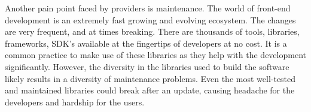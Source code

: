 Another pain point faced by providers is maintenance. The world of front-end development is an extremely fast growing and evolving ecosystem. The changes are very frequent, and at times breaking. There are thousands of tools, libraries, frameworks, SDK’s available at the fingertips of developers at no cost. It is a common practice to make use of these libraries as they help with the development significantly. However, the diversity in the libraries used to build the software likely results in a diversity of maintenance problems. Even the most well-tested and maintained libraries could break after an update, causing headache for the developers and hardship for the users.